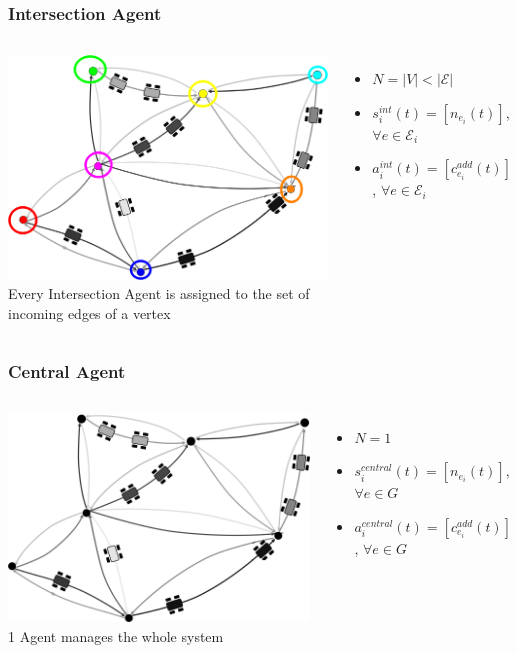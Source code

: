 \documentclass{beamer}
\begin{document}
	\begin{frame}
		\frametitle{Intersection Agent}
		\begin{columns}
			\includegraphics[width=\textwidth]{intersection.png}
			Every Intersection Agent is assigned to the set of incoming edges of a vertex
			\begin{itemize}
				\item $N = |V| < |\mathcal{E}|$
				\item $s_i^{int}(t) = [n_{e_i}(t)]$, $\forall e \in \mathcal{E}_i$
				\item $a_i^{int}(t) = [c_{e_i}^{add}(t)]$, $\forall e \in \mathcal{E}_i$
			\end{itemize}
		\end{columns}
	\end{frame}
	\begin{frame}
		\frametitle{Central Agent}
		\begin{columns}
		\column{.5\textwidth}
			\includegraphics[width=\textwidth]{central.png}
		\column{.5\textwidth}
			1 Agent manages the whole system
			\begin{itemize}
				\item $N = 1$
				\item $s_i^{central}(t) = [n_{e_i}(t)]$, $\forall e \in G$
				\item $a_i^{central}(t) = [c_{e_i}^{add}(t)]$, $\forall e \in G$
			\end{itemize}
		\end{columns}
	\end{frame}
\end{document}
